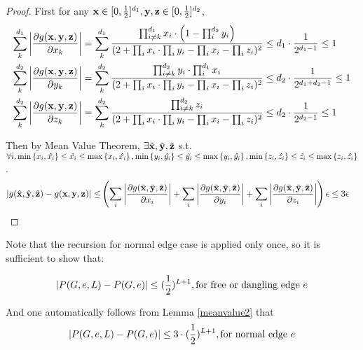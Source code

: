 	\begin{proof}
		First for any ${\bf x} \in [0, \frac{1}{2}]^{d_1} , {\bf y,z} \in [0, \frac{1}{2}]^{d_2}$,
		\begin{align*}
		\sum_k^{d_1} \left\vert \frac{\partial g({\bf x,y,z})}{\partial x_k} \right\vert &= \sum_k^{d_1} \frac{\prod_{i\neq k}^{d_1} x_i \cdot \left( 1 - \prod_i^{d_2} y_i \right)}{(2+\prod_i x_i \cdot \prod_i y_i - \prod_i x_i - \prod_i z_i)^2}
		\leq d_1\cdot  \frac{1}{2^{d_1 - 1}}  \leq 1 \\
		\sum_k^{d_2} \left\vert \frac{\partial g({\bf x,y,z})}{\partial y_k} \right\vert &= \sum_k^{d_2} \frac{\prod_{i\neq k}^{d_2} y_i \cdot \prod_{i}^{d_1} x_i}{(2+\prod_i x_i \cdot \prod_i y_i - \prod_i x_i - \prod_i z_i)^2}
		\leq d_2 \cdot \frac{1}{2^{d_1 + d_2 - 1}} \leq 1 \\
		\sum_k^{d_2} \left\vert \frac{\partial g({\bf x,y,z})}{\partial z_k} \right\vert &= \sum_k^{d_2} \frac{\prod_{i\neq k}^{d_2} z_i }{(2+\prod_i x_i \cdot \prod_i y_i - \prod_i x_i - \prod_i z_i)^2}
		\leq d_2 \cdot \frac{1}{2^{d_2 - 1}} \leq 1
		\end{align*}

		Then by Mean Value Theorem, $\exists \tilde{\bf x}, \tilde{\bf y},  \tilde{\bf z}$ s.t. $\forall i, \min\left\{x_i,\hat{x_i}\right\} \leq \tilde{x_i} \leq \max\left\{x_i, \hat{x_i}\right\}, \min\left\{y_i,\hat{y_i}\right\} \leq \tilde{y_i} \leq \max\left\{y_i, \hat{y_i}\right\}, \min\left\{z_i,\hat{z_i}\right\} \leq \tilde{z_i} \leq \max\left\{z_i, \hat{z_i}\right\}$.
		\begin{align*}
		\left\vert g(\hat{\bf x}, \hat{\bf y}, \hat{\bf z}) - g({\bf x,y,z})\right\vert \leq &
		\left(  \sum_i\left\vert \frac{\partial g(\tilde{\bf x},\tilde{\bf y},\tilde{\bf z} )}{\partial x_i}\right\vert + \sum_i\left\vert \frac{\partial g(\tilde{\bf x},\tilde{\bf y},\tilde{\bf z} )}{\partial y_i}\right\vert +  \sum_i\left\vert \frac{\partial g(\tilde{\bf x},\tilde{\bf y},\tilde{\bf z} )}{\partial z_i}\right\vert \right)  \epsilon
		\leq  3\epsilon
		\end{align*}
	\end{proof}


		Note that the recursion for normal edge case is applied only once, so it is sufficient to show that:

		\[\left\vert P(G,e,L) - P(G,e)\right\vert \leq (\frac{1}{2})^{L+1}, \textrm{for free or dangling edge $e$}\]
		
		And one automatically follows from Lemma \ref{meanvalue2} that
		\[\left\vert P(G,e,L) - P(G,e)\right\vert \leq 3\cdot(\frac{1}{2})^{L+1}, \textrm{for normal edge $e$}\]

